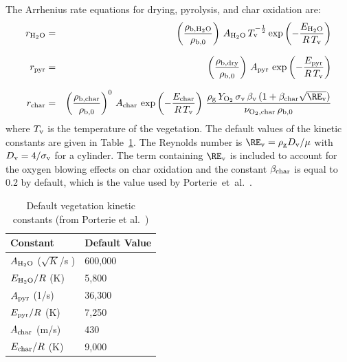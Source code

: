 \documentclass[11pt]{book}
\begin{document}
The Arrhenius rate equations for drying, pyrolysis, and char oxidation are:
\begin{eqnarray}
  r_{\rm H_2O} &=& \left( \frac{\rho_{\rm b, H_2O}}{\rho_{\rm b,0}} \right)   \, A_{\rm H_2O} \, T_{\rm v}^{-\frac{1}{2}} \exp \left(-\frac{E_{\rm H_2O}}{R \, T_{\rm v}} \right)  \\[.1in]
  r_{\rm pyr}  &=& \left( \frac{\rho_{\rm b,dry}}{\rho_{\rm b,0}}   \right)   \, A_{\rm pyr} \, \exp \left({-\frac{E_{\rm pyr}}{R \, T_{\rm v}}} \right)  \\[.1in]
  r_{\rm char} &=& \left( \frac{\rho_{\rm b,char}}{\rho_{\rm b,0}}  \right)^0 \, A_{\rm char} \,  \exp \left( -\frac{E_{\rm char}}{R \, T_{\rm v}} \right) \,
  \frac{ \rho_{\rm g}\, Y_{\rm O_2}\, \sigma_{\rm v}\, \beta_{\rm v}\, (1+\beta_{\rm char}\sqrt{\RE_{\rm v}}) }{\nu_{\rm O_2,char} \, \rho_{\rm b,0}}
\end{eqnarray}
where $T_{\rm v}$ is the temperature of the vegetation. The default values of the kinetic constants are given in Table~\ref{tab:veg_kinetics}. The Reynolds number is $\RE_{\rm v} = \rho_{\rm g} D_{\rm v} / \mu $ with $D_{\rm v} = 4/\sigma_{\rm v}$ for a cylinder. The term containing $\RE_{\rm v}$ is included to account for the oxygen blowing effects on char oxidation and the constant $\beta_{\rm char}$ is equal to 0.2 by default, which is the value used by Porterie~et~al.~\cite{Porterie:2006}.

\begin{table}[!ht]
\caption[Default vegetation kinetic constants]{Default vegetation kinetic constants (from Porterie et al.~\cite{Porterie:2006})}
\vspace{0.1in}
\label{tab:veg_kinetics}
\begin{center}
\begin{tabular}{|l|l|}
\hline
Constant                 &   Default Value  \\ \hline \hline
$A_{\rm H_2O}$ ($\sqrt{K}$/s )          & 600,000 \\ \hline
$E_{\rm H_2O}/R$ (K)         & 5,800 \\ \hline
$A_{\rm pyr}$ (1/s)           & 36,300 \\ \hline
$E_{\rm pyr}/R$ (K)            & 7,250  \\ \hline
$A_{\rm char}$ (m/s)          & 430 \\ \hline
$E_{\rm char}/R$ (K)           & 9,000 \\ \hline
\end{tabular}
\end{center}
\end{table}
\end{document}
